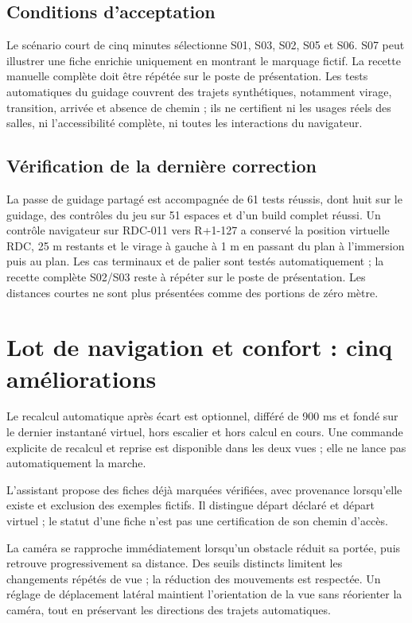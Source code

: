 \documentclass[11pt,a4paper]{article}
\begin{document}
\subsection{Conditions d'acceptation}
Le scénario court de cinq minutes sélectionne S01, S03, S02, S05 et S06. S07 peut illustrer une fiche enrichie uniquement en montrant le marquage fictif. La recette manuelle complète doit être répétée sur le poste de présentation. Les tests automatiques du guidage couvrent des trajets synthétiques, notamment virage, transition, arrivée et absence de chemin ; ils ne certifient ni les usages réels des salles, ni l'accessibilité complète, ni toutes les interactions du navigateur.


\subsection{Vérification de la dernière correction}
La passe de guidage partagé est accompagnée de 61 tests réussis, dont huit sur le guidage, des contrôles du jeu sur 51 espaces et d'un build complet réussi. Un contrôle navigateur sur RDC-011 vers R+1-127 a conservé la position virtuelle RDC, 25 m restants et le virage à gauche à 1 m en passant du plan à l'immersion puis au plan. Les cas terminaux et de palier sont testés automatiquement ; la recette complète S02/S03 reste à répéter sur le poste de présentation. Les distances courtes ne sont plus présentées comme des portions de zéro mètre.

\section{Lot de navigation et confort : cinq améliorations}
Le recalcul automatique après écart est optionnel, différé de 900 ms et fondé sur le dernier instantané virtuel, hors escalier et hors calcul en cours. Une commande explicite de recalcul et reprise est disponible dans les deux vues ; elle ne lance pas automatiquement la marche.

L'assistant propose des fiches déjà marquées vérifiées, avec provenance lorsqu'elle existe et exclusion des exemples fictifs. Il distingue départ déclaré et départ virtuel ; le statut d'une fiche n'est pas une certification de son chemin d'accès.

La caméra se rapproche immédiatement lorsqu'un obstacle réduit sa portée, puis retrouve progressivement sa distance. Des seuils distincts limitent les changements répétés de vue ; la réduction des mouvements est respectée. Un réglage de déplacement latéral maintient l'orientation de la vue sans réorienter la caméra, tout en préservant les directions des trajets automatiques.
\end{document}
